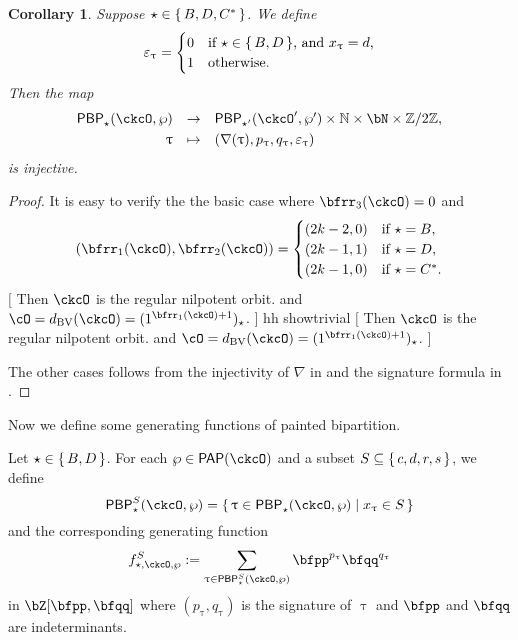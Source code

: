 \documentclass[12pt,a4paper]{amsart}
\newcommand{\trivial}[2][]{\if\relax\detokenize{#1}\relax
  {%
      \color{orange} \vspace{0em} $[$  #2 $]$
      \color{black}
  }
  \else
\ifx#1h
\ifcsname showtrivial\endcsname
{%
    \color{orange} \vspace{0em}  $[$ #2 $]$
    \color{black}
}
\fi
\else {\red Wrong argument!} \fi
\fi
}
\def\subset{\subseteq}
\newcommand{\BN}{{\mathbb {N}}}
\newcommand{\RS}{{\mathrm {S}}}
\newcommand{\Z}{\mathbb{Z}}
\def\DD{\nabla}
\numberwithin{equation}{section}
\newtheorem{cor}[thm]{Corollary}
\theoremstyle{remark}
\def\dBV{d_{\mathrm{BV}}}
\def\DD{\nabla}
\def\PP{\mathsf{PAP}}
\def\PBP{\mathsf{PBP}}
\def\PBPop#1#2#3#4{\PBP_{#1}^{#2}(#3,#4)}
\newcommand{\PBPOP}[1][]{\PBPop{\star}{#1}{\ckcO}{\wp}}
\def\PBPOPp{\PBPop{\star'}{}{\ckcO'}{\wp'}}
\begin{document}
\begin{cor}\label{prop:DD.BDinj}
  Suppose $\star \in \set{B, D,C^*}$.
  We define
  \[
    \varepsilon_{\uptau} = \begin{cases}
      0 & \text{if $\star\in \set{B,D}$, and $x_{\uptau}=d$,}\\
      1 & \text{otherwise.}
    \end{cases}
  \]
  Then the map
\begin{equation}
  \begin{array}{rcl}
   \PBPOP&\rightarrow&
   \PBPOPp \times \BN\times \bN\times \Z/2\Z, \smallskip\\
   \uptau& \mapsto & (\DD(\uptau), p_\uptau, q_\uptau, \varepsilon_\uptau)
   \end{array}
\end{equation}
is injective.
\end{cor}
\begin{proof}
  It is easy to verify the the basic case where $\bfrr_{3}(\ckcO)=0$ and
    \[
      (\bfrr_{1}(\ckcO), \bfrr_{2}(\ckcO))
      =
      \begin{cases}
        (2k-2,0) & \text{if } \star=B,\\
        (2k-1,1) & \text{if } \star=D,\\
        (2k-1,0) & \text{if } \star=C^{*}.\\
      \end{cases}
    \]
    \trivial[h]{
    Then $\ckcO$ is the regular nilpotent orbit.
    and $\cO =\dBV(\ckcO) = (1^{\bfrr_{1}(\ckcO)+1})_{\star}$.
    }
    The other cases follows from the injectivity of $\DD$ in 
    and the signature formula in .
\end{proof}



Now we define some generating functions of painted bipartition. %


Let $\star \in \set{B,D}$.
For each $\wp\in \PP(\ckcO)$ and a subset $S\subset \set{c,d,r,s}$, we define
\[
  \PBPOP[S] = \set{\uptau\in \PBPOP|x_{\uptau}\in S}
\]
and the corresponding generating function
\[
   f_{\star,\ckcO,\wp}^{S} := \sum_{\uptau \in \PBPOP[S]} \bfpp^{p_{\uptau}} \bfqq^{q_{\uptau}}
\]
in $\bZ[\bfpp,\bfqq]$ where $(p_{\uptau}, q_{\uptau})$ is the signature of
$\uptau$ and $\bfpp$
and $\bfqq$ are indeterminants.

\def\Tdk{g_{k}^{\mathrm d}}
\def\Trck{g_{k}^{\mathrm{rc}}}
\def\Tsk{g_{k}^{\mathrm s}}
\def\RS{\nu}
\end{document}
